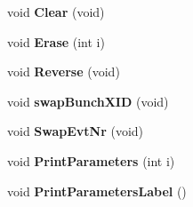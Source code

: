 \begin{DoxyCompactItemize}
\item 
void {\bfseries Clear} (void)\label{classLConverter_a9251a44afb49f1215749cb2e409beb6d}

\item 
void {\bfseries Erase} (int i)\label{classLConverter_a4966e1ffc3dd538c66336cf8d29fea22}

\item 
void {\bfseries Reverse} (void)\label{classLConverter_a308aa32941ea7dadb65354958ed26b6b}

\item 
void {\bfseries swapBunchXID} (void)\label{classLConverter_ac018aa0de8c404849ac58ba98232a7b2}

\item 
void {\bfseries SwapEvtNr} (void)\label{classLConverter_a8d23856e6cd95500295bfc4f7decf252}

\item 
void {\bfseries PrintParameters} (int i)\label{classLConverter_adf37266688bb924ffe3ca72787115a17}

\item 
void {\bfseries PrintParametersLabel} ()\label{classLConverter_a0ca415c8251400c2db08b8efeaeda600}

\end{DoxyCompactItemize}
